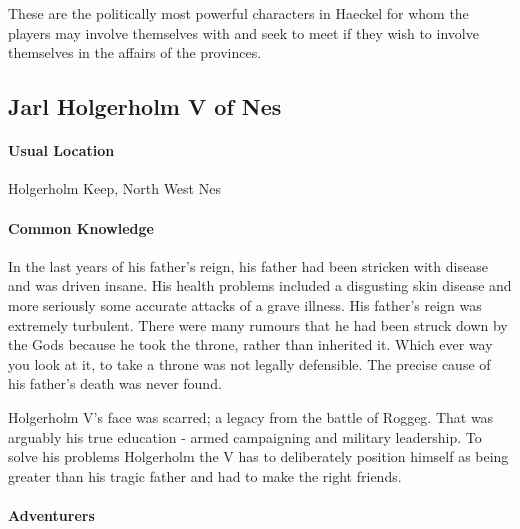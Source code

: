 \begin{multicols}{2}



These are the politically most powerful characters in Haeckel for whom the players may involve themselves with and seek to meet if they wish to involve themselves in the affairs of the provinces.
 
\subsection{Jarl Holgerholm V of Nes}
    \paragraph{Usual Location} Holgerholm Keep, North West Nes
    \paragraph{Common Knowledge} In the last years of his father's reign, his father had been stricken with disease and was driven insane. His health problems included a disgusting skin disease and more seriously some accurate attacks of a grave illness. His father's reign was extremely turbulent. There were many rumours that he had been struck down by the Gods because he took the throne, rather than inherited it. Which ever way you look at it, to take a throne was not legally defensible. The precise cause of his father's death was never found. 
    
   Holgerholm V's face was scarred; a legacy from the battle of Roggeg. That was arguably his true education - armed campaigning and military leadership. To solve his problems Holgerholm the V has to deliberately position himself as being greater than his tragic father and had to make the right friends. \paragraph{Adventurers}

\end{multicols}
